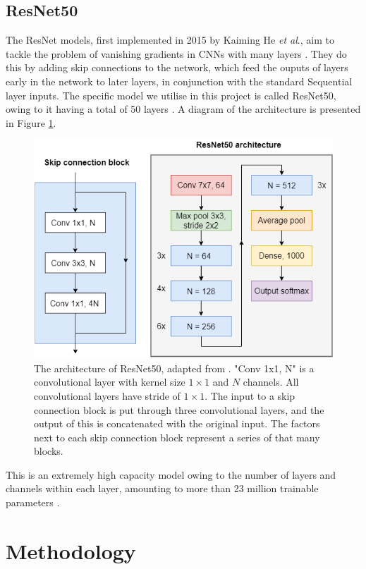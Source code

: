 \documentclass[12pt]{article}
\begin{document}
\subsection{ResNet50}
The ResNet models, first implemented in 2015 by Kaiming He \textit{et al}., aim to tackle the problem of vanishing gradients in CNNs with many layers \cite{He15}. They do this by adding skip connections to the network, which feed the ouputs of layers early in the network to later layers, in conjunction with the standard Sequential layer inputs. The specific model we utilise in this project is called ResNet50, owing to it having a total of 50 layers \cite{He15}. A diagram of the architecture is presented in Figure \ref{resnet50}.
\begin{figure}[!h]
\centering
\includegraphics[width=4.5in]{images/resnet50.png}
\caption{The architecture of ResNet50, adapted from \cite{He15}. "Conv 1x1, N" is a convolutional layer with kernel size $1\times1$ and $N$ channels. All convolutional layers have stride of $1\times1$. The input to a skip connection block is put through three convolutional layers, and the output of this is concatenated with the original input. The factors next to each skip connection block represent a series of that many blocks.}
\label{resnet50}
\end{figure}
This is an extremely high capacity model owing to the number of layers and channels within each layer, amounting to more than 23 million trainable parameters \cite{He15}.

\section{Methodology}
\end{document}
